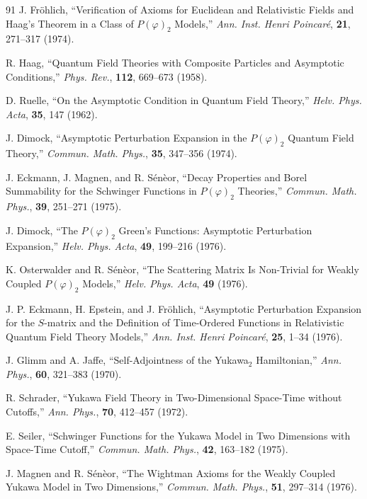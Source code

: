 \begin{thebibliography}{91}
J. Fr\"ohlich, ``Verification of Axioms for Euclidean and Relativistic Fields
and Haag's Theorem in a Class of $P(\varphi)_2$ Models,'' \emph{Ann. Inst.
Henri Poincar\'e}, \textbf{21}, 271--317 (1974).

R. Haag, ``Quantum Field Theories with Composite Particles and Asymptotic
Conditions,'' \emph{Phys. Rev.}, \textbf{112}, 669--673 (1958).

D. Ruelle, ``On the Asymptotic Condition in Quantum Field Theory,''
\emph{Helv. Phys. Acta}, \textbf{35}, 147 (1962).

J. Dimock, ``Asymptotic Perturbation Expansion in the $P(\varphi)_2$ Quantum
Field Theory,'' \emph{Commun. Math. Phys.}, \textbf{35}, 347--356 (1974).

J. Eckmann, J. Magnen, and R. S\'en\`eor, ``Decay Properties and Borel
Summability for the Schwinger Functions in $P(\varphi)_2$ Theories,''
\emph{Commun. Math. Phys.}, \textbf{39}, 251--271 (1975).

J. Dimock, ``The $P(\varphi)_2$ Green's Functions: Asymptotic Perturbation
Expansion,'' \emph{Helv. Phys. Acta}, \textbf{49}, 199--216 (1976).

K. Osterwalder and R. S\'en\`eor, ``The Scattering Matrix Is Non-Trivial for
Weakly Coupled $P(\varphi)_2$ Models,'' \emph{Helv. Phys. Acta}, \textbf{49}
(1976).

J. P. Eckmann, H. Epstein, and J. Fr\"ohlich, ``Asymptotic Perturbation
Expansion for the $S$-matrix and the Definition of Time-Ordered Functions in
Relativistic Quantum Field Theory Models,'' \emph{Ann. Inst. Henri Poincar\'e},
\textbf{25}, 1--34 (1976).

J. Glimm and A. Jaffe, ``Self-Adjointness of the Yukawa$_2$ Hamiltonian,''
\emph{Ann. Phys.}, \textbf{60}, 321--383 (1970).

R. Schrader, ``Yukawa Field Theory in Two-Dimensional Space-Time without
Cutoffs,'' \emph{Ann. Phys.}, \textbf{70}, 412--457 (1972).

E. Seiler, ``Schwinger Functions for the Yukawa Model in Two Dimensions with
Space-Time Cutoff,'' \emph{Commun. Math. Phys.}, \textbf{42}, 163--182
(1975).

J. Magnen and R. S\'en\`eor, ``The Wightman Axioms for the Weakly Coupled
Yukawa Model in Two Dimensions,'' \emph{Commun. Math. Phys.}, \textbf{51},
297--314 (1976).


\end{thebibliography}
